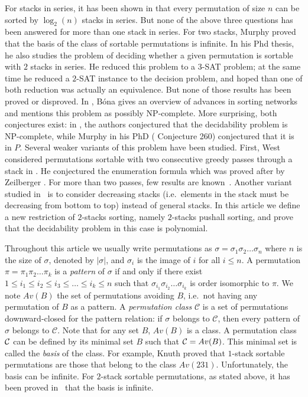 \documentclass[11pt]{article}
\begin{document}
For stacks in series, it has been shown in \cite{Knuth68} that every permutation of size $n$ can be sorted by $\log_2(n)$ stacks in series. 
But none of the above three questions has been answered for more than one stack in series. 
For two stacks, Murphy \cite{Murphy02} proved that the basis of the class of sortable permutations is infinite. 
In his Phd thesis, he also studies the problem of deciding whether a given permutation is sortable with $2$ stacks in series.
He reduced this problem to a $3$-SAT problem;
at the same time he reduced a $2$-SAT instance to the decision problem,
and hoped than one of both reduction was actually an equivalence.
But none of those results has been proved or disproved. 
In \cite{Bona02}, B\'ona gives an overview of advances in sorting networks and mentions this problem as possibly NP-complete.
More surprising, both conjectures exist:
in \cite{AMR02b}, the authors conjectured that the decidability problem is NP-complete,
while Murphy in his PhD (\cite{Murphy02} Conjecture 260) conjectured that it is in $P$.
Several weaker variants of this problem have been studied. 
First, West considered permutations sortable with two consecutive greedy passes through a stack in \cite{West90, West93}. 
He conjectured the enumeration formula which was proved after by Zeilberger \cite{Zeilberger92}. 
For more than two passes, few results are known~\cite{BM00, Ulfarsson11}. 
Another variant studied in~\cite{AMR02b} is to consider decreasing stacks (i.e.~elements in the stack must be decreasing from bottom to top)
instead of general stacks.
In this article we define a new restriction of $2$-stacks sorting, namely $2$-stacks pushall sorting,
and prove that the decidability problem in this case is polynomial.

\bigskip
Throughout this article we usually write permutations as $\sigma = \sigma_1\sigma_2\ldots\sigma_n$ 
where $n$ is the size of $\sigma$, denoted by $|\sigma|$, and $\sigma_i$ is the image of $i$ for all $i \leq n$. 
A permutation $\pi = \pi_1\pi_2\ldots\pi_k$ is a {\em pattern} of $\sigma$ if and only if there exist 
$1 \leq i_1 \leq i_2 \leq i_3\leq \ldots\leq i_k \leq n$ such that $\sigma_{i_1} \sigma_{i_2} \ldots \sigma_{i_k}$ is order isomorphic to $\pi$. 
We note $Av(B)$ the set of permutations avoiding $B$, i.e.~not having any permutation of $B$ as a pattern.
A {\em permutation class} $\mathcal{C}$ is a set of permutations downward-closed for the pattern relation: 
if $\sigma$ belongs to $\mathcal{C}$, then every pattern of $\sigma$ belongs to $\mathcal{C}$. 
Note that for any set $B$, $Av(B)$ is a class.
A permutation class ${\cal C}$ can be defined by its minimal set $B$ such that ${\cal C}=Av(B)$.
This minimal set is called the {\em basis} of the class. 
For example, Knuth proved that $1$-stack sortable permutations are those that belong to the class $Av(231)$.
Unfortunately, the basis can be infinite. 
For $2$-stack sortable permutations, as stated above, it has been proved in~\cite{Murphy02} that the basis is infinite.
\end{document}
